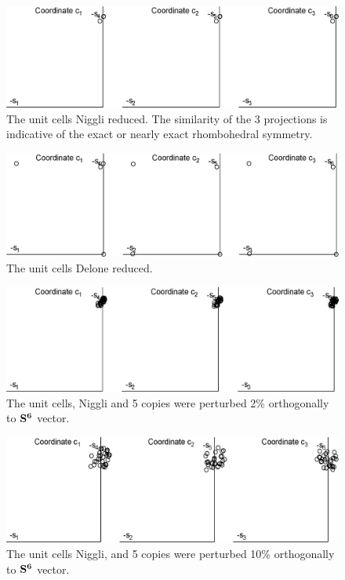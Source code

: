 \documentclass[preprint]{iucr}              %
\numberwithin{equation}{section}
\newcommand{\SVI}[0]{$\bf{S^{6}}$}
\begin{document}
\begin{figure}
	\includegraphics[width=1.0\textwidth]{2_06}
	\caption{The unit cells Niggli reduced. The similarity 
	of the 3 projections is indicative of the exact or nearly
exact rhombohedral symmetry.}
	\label{fig2}
\end{figure}
\begin{figure}
	\includegraphics[width=1.0\textwidth]{3_03}
	\caption{The unit cells Delone reduced. }
	\label{fig3}
\end{figure}

\begin{figure}
	\includegraphics[width=1.0\textwidth]{4_13}
	\caption{The unit cells, Niggli and 5 copies were perturbed 2\%
	orthogonally to \SVI{} vector. }
	\label{fig4}
\end{figure}

\begin{figure}
	\includegraphics[width=1.0\textwidth]{5_21}
	\caption{The unit cells Niggli, and 5 copies were perturbed 10\%
		orthogonally to \SVI{} vector. }
	\label{fig5}
\end{figure}
\end{document}
